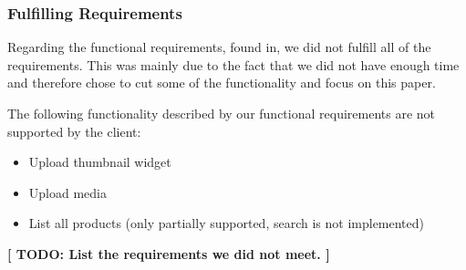 \subsubsection{Fulfilling Requirements}
Regarding the functional requirements, found in, we did not fulfill all of the requirements. This was mainly due to the fact that we did not have enough time and therefore chose to cut some of the functionality and focus on this paper.

The following functionality described by our functional requirements are not supported by the client:
\begin{itemize}
	\item Upload thumbnail widget
	\item Upload media
	\item List all products (only partially supported, search is not implemented)
\end{itemize}

\textbf{[ TODO: List the requirements we did not meet. ]}